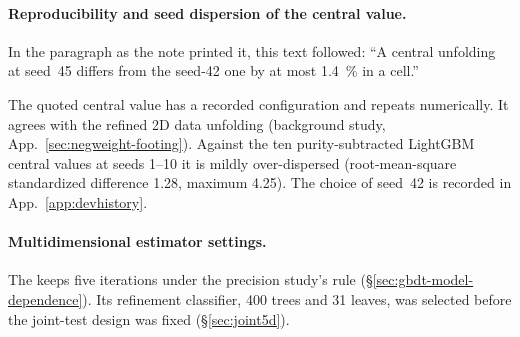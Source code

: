 \paragraph{Reproducibility and seed dispersion of the central value.} In the paragraph as the note printed it, this text followed: ``A central unfolding at seed~45 differs from the seed-42 one by at most \SI{1.4}{\percent} in a cell.''\par The quoted central value has a recorded configuration and repeats numerically. It agrees with the refined 2D data unfolding (background study, App.~\ref{sec:negweight-footing}). Against the ten purity-subtracted LightGBM central values at seeds 1--10 it is mildly over-dispersed (root-mean-square standardized difference 1.28, maximum 4.25). The choice of seed~42 is recorded in App.~\ref{app:devhistory}.

\paragraph{Multidimensional estimator settings.} The \estMultiD{} keeps five iterations under the precision study's rule (\S\ref{sec:gbdt-model-dependence}). Its refinement classifier, 400 trees and 31 leaves, was selected before the joint-test design was fixed (\S\ref{sec:joint5d}).

